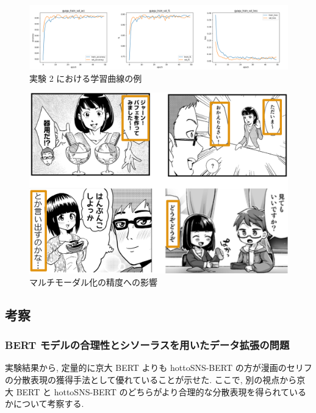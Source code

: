 \newpage

\begin{figure}[!h]
  \centering
  \includegraphics[width=1.0\hsize]{doc/figures/ex2_graph_hotto_gyagu.png}
  \caption{実験 2 における学習曲線の例}
  \label{fig:ex2_graph}
\end{figure}

\begin{figure}[!h]
  \vspace{15mm}
  \centering
  \includegraphics[width=0.8\hsize]{doc/figures/multimodal_add_seikai.png}
  \caption{マルチモーダル化の精度への影響}
  \label{fig:multimodal_add_seikai}
\end{figure}

\newpage
\changeindent{0cm}
\subsection{考察}
\changeindent{2cm}

\changeindent{0cm}
\subsubsection{BERT モデルの合理性とシソーラスを用いたデータ拡張の問題}
\changeindent{2cm}

実験結果から, 定量的に京大 BERT よりも hottoSNS-BERT の方が漫画のセリフの分散表現の獲得手法として優れていることが示せた. ここで, 別の視点から京大 BERT と hottoSNS-BERT のどちらがより合理的な分散表現を得られているかについて考察する.

